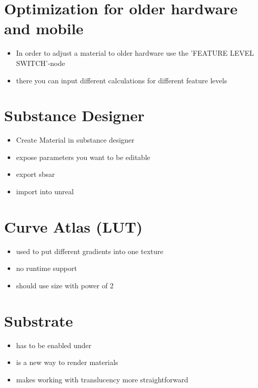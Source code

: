     \section{Optimization for older hardware and mobile}
        \begin{itemize}
            \item In order to adjust a material to older hardware use the 'FEATURE LEVEL SWITCH'-node
            \item there you can input different calculations for different feature levels
        \end{itemize}


    \section{Substance Designer}
    \begin{itemize}
        \item Create Material in substance designer
        \item expose parameters you want to be editable
        \item export sbsar
        \item import into unreal 
    \end{itemize}


    \section{Curve Atlas (LUT)}
        \begin{itemize}
            \item used to put different gradients into one texture
            \item no runtime support
            \item should use size with power of 2
        \end{itemize}


    \section{Substrate}
        \begin{itemize}
            \item has to be enabled under 
            \item is a new way to render materials
            \item makes working with translucency more straightforward 
        \end{itemize}

